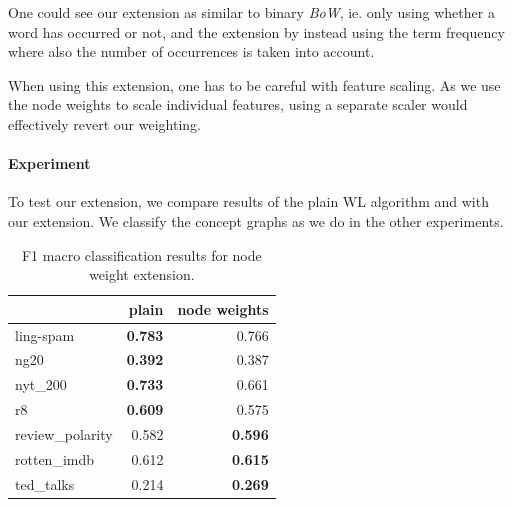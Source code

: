 One could see our extension as similar to binary \textit{BoW}, ie. only using whether a word has occurred or not, and the extension by instead using the term frequency where also the number of occurrences is taken into account.

When using this extension, one has to be careful with feature scaling. As we use the node weights to scale individual features, using a separate scaler would effectively revert our weighting.


\paragraph{Experiment}
To test our extension, we compare results of the plain WL algorithm and with our extension.
We classify the concept graphs as we do in the other experiments.

\begin{table}[htb!]
	\centering
\begin{tabular}{lrr}
	{} &  plain &  node weights \\
	\midrule
	ling-spam       & \textbf{0.783} & 0.766 \\
	ng20            & \textbf{0.392} & 0.387 \\
	nyt\_200         & \textbf{0.733} & 0.661 \\
	r8              & \textbf{0.609} & 0.575 \\
	review\_polarity & 0.582 & \textbf{0.596} \\
	rotten\_imdb     & 0.612 & \textbf{0.615} \\
	ted\_talks       & 0.214 & \textbf{0.269} \\
	\bottomrule
\end{tabular}
\caption[Results: Classification using node weight WL extension]{F1 macro classification results for node weight extension.}\label{table:wl_node_weight_extension}
\end{table}

